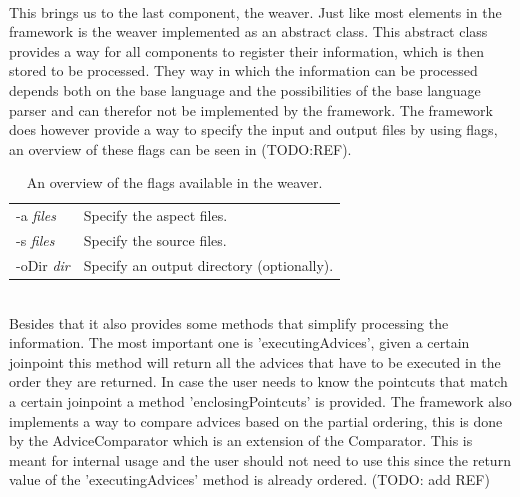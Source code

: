\documentclass[a4paper]{report}
\begin{document}
\\
This brings us to the last component, the weaver. Just like most elements in the framework is the weaver implemented as an abstract class. This abstract class provides a way for all components to register their information, which is then stored to be processed. They way in which the information can be processed depends both on the base language and the possibilities of the base language parser and can therefor not be implemented by the framework. The framework does however provide a way to specify the input and output files by using flags, an overview of these flags can be seen in (TODO:REF).
\begin{table}[h]
\centering
\begin{tabular}{l l}
-a \textit{files} & Specify the aspect files.\\ [2ex]
-s \textit{files} & Specify the source files.\\ [2ex]
-oDir \textit{dir} & Specify an output directory (optionally).\\
\end{tabular}
\caption[tab:Flags]{An overview of the flags available in the weaver.}
\label{tab:Flags}
\end{table}\\
Besides that it also provides some methods that simplify processing the information. The most important one is 'executingAdvices', given a certain joinpoint this method will return all the advices that have to be executed in the order they are returned. In case the user needs to know the pointcuts that match a certain joinpoint a method 'enclosingPointcuts' is provided. The framework also implements a way to compare advices based on the partial ordering, this is done by the AdviceComparator which is an extension of the Comparator. This is meant for internal usage and the user should not need to use this since the return value of the 'executingAdvices' method is already ordered. (TODO: add REF)
\end{document}

